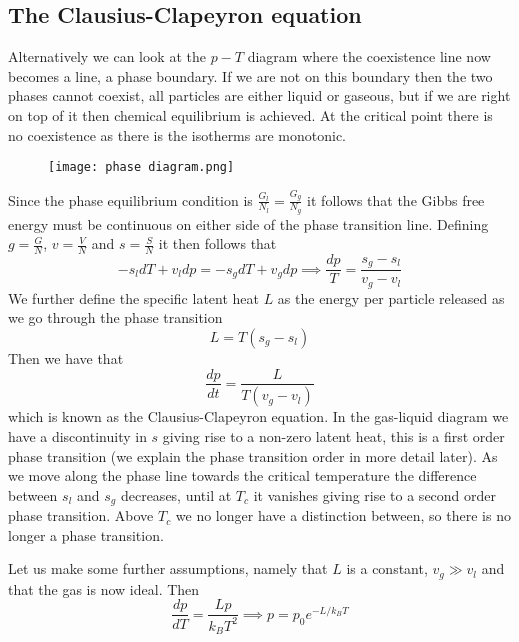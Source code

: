 \documentclass[a4paper,11pt,oneside]{book}
\begin{document}
\subsection*{The Clausius-Clapeyron equation}
Alternatively we can look at the $p-T$ diagram where the coexistence line now becomes a line, a phase boundary. If we are not on this boundary then the two phases cannot coexist, all particles are either liquid or gaseous, but if we are right on top of it then chemical equilibrium is achieved. At the critical point there is no coexistence as there is the isotherms are monotonic.

\begin{figure}[h!]
    \centering
    \texttt{[image: phase diagram.png]}
    \label{fig:my_label}
\end{figure}

Since the phase equilibrium condition is $\frac{G_{l}}{N_l}=\frac{G_{g}}{N_g}$ it follows that the Gibbs free energy must be continuous on either side of the phase transition line. Defining $g=\frac{G}{N}$, $v=\frac{V}{N}$ and $s=\frac{S}{N}$ it then follows that
\begin{equation}
    -s_ldT + v_l dp = -s_g dT + v_gdp \implies \frac{dp}{T} = \frac{s_g-s_l}{v_g-v_l}
\end{equation}
We further define the specific latent heat $L$ as the energy per particle released as we go through the phase transition
\begin{equation}
    L = T(s_g-s_l)
\end{equation}
Then we have that
\begin{equation}
    \boxed{\frac{dp}{dt} = \frac{L}{T(v_g-v_l)}}
\end{equation}
which is known as the Clausius-Clapeyron equation. In the gas-liquid diagram we have a discontinuity in $s$ giving rise to a non-zero latent heat, this is a first order phase transition (we explain the phase transition order in more detail later). As we move along the phase line towards the critical temperature the difference between $s_l$ and $s_g$ decreases, until at $T_c$ it vanishes giving rise to a second order phase transition. Above $T_c$ we no longer have a distinction between, so there is no longer a phase transition. 

Let us make some further assumptions, namely that $L$ is a constant, $v_g \gg v_l$ and that the gas is now ideal. Then
\begin{equation}
    \frac{dp}{dT} = \frac{Lp}{k_BT^2} \implies p = p_0 e^{-L/k_BT}
\end{equation}
\end{document}
